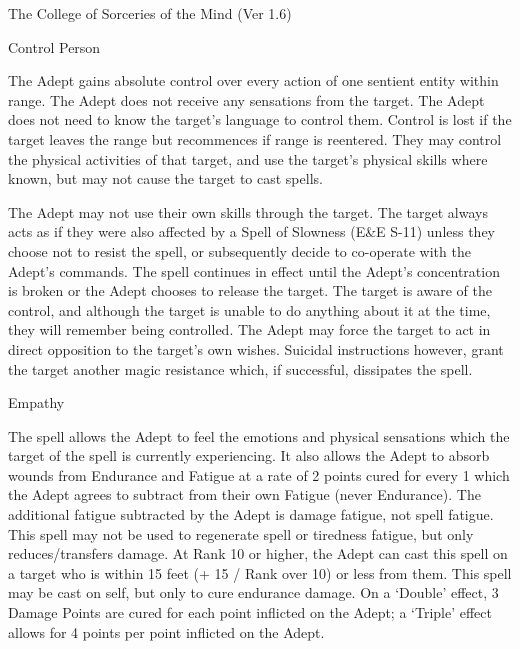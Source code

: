 \begin{Chapter}{The College of Sorceries of the Mind (Ver 1.6)}
\begin{spell}[G-2]{Control Person}

\begin{effects}
The Adept gains absolute control over every action of one sentient
entity within range.  The Adept does not receive any sensations from
the target.  The Adept does not need to know the target’s language to
control them. Control is lost if the target leaves the range but
recommences if range is reentered.  They may control the physical
activities of that target, and use the target’s physical skills where
known, but may not cause the target to cast spells.

The Adept may not use their own skills through the target.  The target
always acts as if they were also affected by a Spell of Slowness (E\&E
S-11) unless they choose not to resist the spell, or subsequently
decide to co-operate with the Adept’s commands.  The spell continues
in effect until the Adept’s concentration is broken or the Adept
chooses to release the target.  The target is aware of the control,
and although the target is unable to do anything about it at the time,
they will remember being controlled. The Adept may force the target to
act in direct opposition to the target’s own wishes. Suicidal
instructions however, grant the target another magic resistance which,
if successful, dissipates the spell.
\end{effects}
\end{spell}

\begin{spell}[G-3]{Empathy}

\begin{effects}
The spell allows the Adept to feel the emotions and physical
sensations which the target of the spell is currently experiencing. It
also allows the Adept to absorb wounds from Endurance and Fatigue at a
rate of 2 points cured for every 1 which the Adept agrees to subtract
from their own Fatigue (never Endurance).  The additional fatigue
subtracted by the Adept is damage fatigue, not spell fatigue. This
spell may not be used to regenerate spell or tiredness fatigue, but
only reduces/transfers damage. At Rank 10 or higher, the Adept can
cast this spell on a target who is within 15 feet (+ 15 / Rank over
10) or less from them.  This spell may be cast on self, but only to
cure endurance damage.  On a ‘Double’ effect, 3 Damage Points are
cured for each point inflicted on the Adept; a ‘Triple’ effect allows
for 4 points per point inflicted on the Adept.
\end{effects}
\end{spell}


\end{Chapter}
